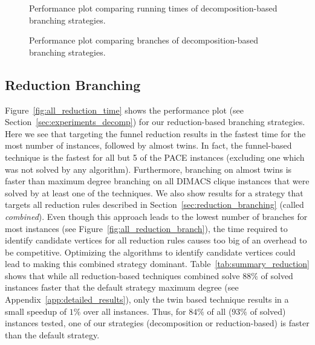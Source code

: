 \documentclass[a4paper,UKenglish,cleveref, autoref, thm-restate]{lipics-v2021}
\begin{document}

\begin{figure}[t]
	\centering
	
	\caption{Performance plot comparing running times of decomposition-based branching strategies.}\label{fig:all_decomp_time}
\end{figure}

\begin{figure}[t]
	\centering
	
	\caption{Performance plot comparing branches of decomposition-based branching strategies.}\label{fig:all_decomp_branch}
\end{figure}


\subsection{Reduction Branching}
Figure~\ref{fig:all_reduction_time} shows the performance plot (see
Section~\ref{sec:experiments_decomp}) for our reduction-based branching strategies. Here we see that targeting the funnel reduction
results in the fastest time for the most number of instances, followed by almost
twins. In fact, the
funnel-based technique is the fastest for all but 5 of the PACE instances (excluding
one which was not solved by any algorithm). Furthermore, branching on almost
twins is faster than maximum degree branching on all DIMACS clique instances that
were solved by at least one of the techniques. We also show results for a strategy that targets all reduction rules
described in Section~\ref{sec:reduction_branching} (called \emph{combined}). Even though this approach
leads to the lowest number of branches for most instances (see Figure~\ref{fig:all_reduction_branch}), the time required to
identify candidate vertices for all reduction rules causes too big of an
overhead to be competitive. Optimizing the algorithms to identify candidate
vertices could lead to making this combined strategy
dominant. Table~\ref{tab:summary_reduction} shows that while all reduction-based
techniques combined solve $88\%$ of solved instances faster that the default
strategy maximum degree (see Appendix~\ref{app:detailed_results}), only the twin
based technique results in a small speedup of $1\%$ over all instances.
Thus, for $84\%$ of all ($93\%$ of solved) instances tested, one of our strategies (decomposition or reduction-based) is faster than the default strategy.
\end{document}
